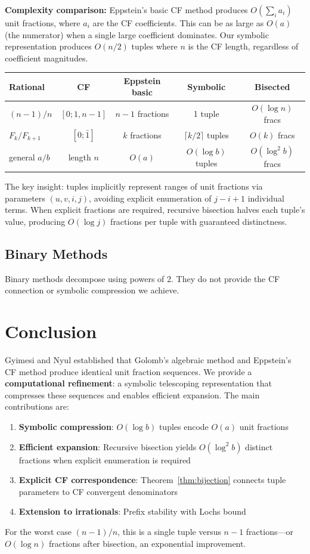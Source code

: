 \documentclass[11pt]{article}
\theoremstyle{definition}
\theoremstyle{remark}
\begin{document}
\textbf{Complexity comparison:} Eppstein's basic CF method produces
$O(\sum_i a_i)$ unit fractions, where $a_i$ are the CF coefficients. This can be
as large as $O(a)$ (the numerator) when a single large coefficient dominates.
Our symbolic representation produces $O(n/2)$ tuples where $n$ is the CF length,
regardless of coefficient magnitudes.

\begin{center}
\begin{tabular}{l c c c c}
\textbf{Rational} & \textbf{CF} & \textbf{Eppstein basic} & \textbf{Symbolic} & \textbf{Bisected} \\
\hline
$(n-1)/n$ & $[0; 1, n-1]$ & $n-1$ fractions & 1 tuple & $O(\log n)$ fracs \\
$F_k/F_{k+1}$ & $[0; \bar{1}]$ & $k$ fractions & $\lceil k/2 \rceil$ tuples & $O(k)$ fracs \\
general $a/b$ & length $n$ & $O(a)$ & $O(\log b)$ tuples & $O(\log^2 b)$ fracs \\
\end{tabular}
\end{center}

The key insight: tuples implicitly represent ranges of unit fractions via parameters
$(u, v, i, j)$, avoiding explicit enumeration of $j - i + 1$ individual terms.
When explicit fractions are required, recursive bisection halves each tuple's value,
producing $O(\log j)$ fractions per tuple with guaranteed distinctness.

\subsection{Binary Methods}
Binary methods decompose using powers of 2. They do not provide the CF connection
or symbolic compression we achieve.

\section{Conclusion}

Gyimesi and Nyul established that Golomb's algebraic method and Eppstein's CF
method produce identical unit fraction sequences. We provide a \textbf{computational
refinement}: a symbolic telescoping representation that compresses these sequences
and enables efficient expansion. The main contributions are:
\begin{enumerate}
\item \textbf{Symbolic compression}: $O(\log b)$ tuples encode $O(a)$ unit fractions
\item \textbf{Efficient expansion}: Recursive bisection yields $O(\log^2 b)$ distinct
      fractions when explicit enumeration is required
\item \textbf{Explicit CF correspondence}: Theorem~\ref{thm:bijection} connects tuple
      parameters to CF convergent denominators
\item \textbf{Extension to irrationals}: Prefix stability with Lochs bound
\end{enumerate}
For the worst case $(n-1)/n$, this is a single tuple versus $n-1$ fractions---or
$O(\log n)$ fractions after bisection, an exponential improvement.
\end{document}
